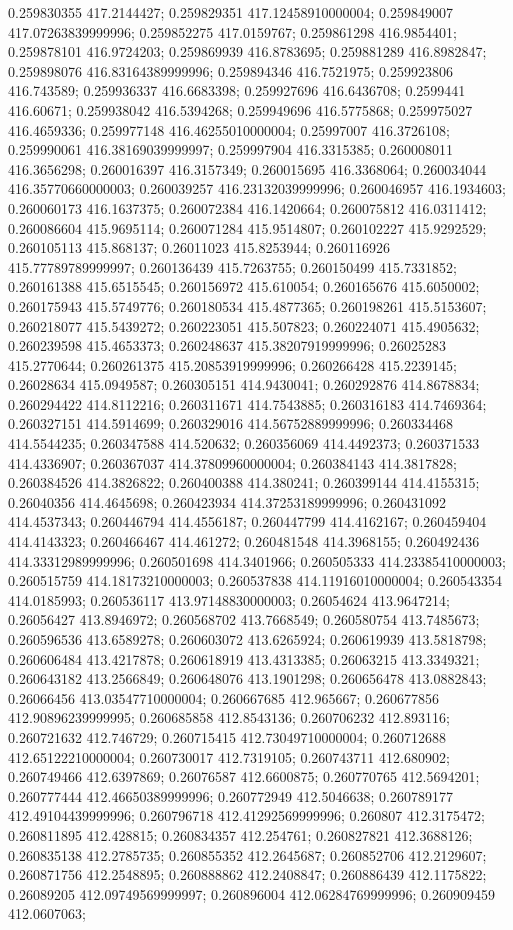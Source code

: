 0.259830355 417.2144427; 0.259829351 417.12458910000004; 0.259849007 417.07263839999996; 0.259852275 417.0159767; 0.259861298 416.9854401; 0.259878101 416.9724203; 0.259869939 416.8783695; 0.259881289 416.8982847; 0.259898076 416.83164389999996; 0.259894346 416.7521975; 0.259923806 416.743589; 0.259936337 416.6683398; 0.259927696 416.6436708; 0.2599441 416.60671; 0.259938042 416.5394268; 0.259949696 416.5775868; 0.259975027 416.4659336; 0.259977148 416.46255010000004; 0.25997007 416.3726108; 0.259990061 416.38169039999997; 0.259997904 416.3315385; 0.260008011 416.3656298; 0.260016397 416.3157349; 0.260015695 416.3368064; 0.260034044 416.35770660000003; 0.260039257 416.23132039999996; 0.260046957 416.1934603; 0.260060173 416.1637375; 0.260072384 416.1420664; 0.260075812 416.0311412; 0.260086604 415.9695114; 0.260071284 415.9514807; 0.260102227 415.9292529; 0.260105113 415.868137; 0.26011023 415.8253944; 0.260116926 415.77789789999997; 0.260136439 415.7263755; 0.260150499 415.7331852; 0.260161388 415.6515545; 0.260156972 415.610054; 0.260165676 415.6050002; 0.260175943 415.5749776; 0.260180534 415.4877365; 0.260198261 415.5153607; 0.260218077 415.5439272; 0.260223051 415.507823; 0.260224071 415.4905632; 0.260239598 415.4653373; 0.260248637 415.38207919999996; 0.26025283 415.2770644; 0.260261375 415.20853919999996; 0.260266428 415.2239145; 0.26028634 415.0949587; 0.260305151 414.9430041; 0.260292876 414.8678834; 0.260294422 414.8112216; 0.260311671 414.7543885; 0.260316183 414.7469364; 0.260327151 414.5914699; 0.260329016 414.56752889999996; 0.260334468 414.5544235; 0.260347588 414.520632; 0.260356069 414.4492373; 0.260371533 414.4336907; 0.260367037 414.37809960000004; 0.260384143 414.3817828; 0.260384526 414.3826822; 0.260400388 414.380241; 0.260399144 414.4155315; 0.26040356 414.4645698; 0.260423934 414.37253189999996; 0.260431092 414.4537343; 0.260446794 414.4556187; 0.260447799 414.4162167; 0.260459404 414.4143323; 0.260466467 414.461272; 0.260481548 414.3968155; 0.260492436 414.33312989999996; 0.260501698 414.3401966; 0.260505333 414.23385410000003; 0.260515759 414.18173210000003; 0.260537838 414.11916010000004; 0.260543354 414.0185993; 0.260536117 413.97148830000003; 0.26054624 413.9647214; 0.26056427 413.8946972; 0.260568702 413.7668549; 0.260580754 413.7485673; 0.260596536 413.6589278; 0.260603072 413.6265924; 0.260619939 413.5818798; 0.260606484 413.4217878; 0.260618919 413.4313385; 0.26063215 413.3349321; 0.260643182 413.2566849; 0.260648076 413.1901298; 0.260656478 413.0882843; 0.26066456 413.03547710000004; 0.260667685 412.965667; 0.260677856 412.90896239999995; 0.260685858 412.8543136; 0.260706232 412.893116; 0.260721632 412.746729; 0.260715415 412.73049710000004; 0.260712688 412.65122210000004; 0.260730017 412.7319105; 0.260743711 412.680902; 0.260749466 412.6397869; 0.26076587 412.6600875; 0.260770765 412.5694201; 0.260777444 412.46650389999996; 0.260772949 412.5046638; 0.260789177 412.49104439999996; 0.260796718 412.41292569999996; 0.260807 412.3175472; 0.260811895 412.428815; 0.260834357 412.254761; 0.260827821 412.3688126; 0.260835138 412.2785735; 0.260855352 412.2645687; 0.260852706 412.2129607; 0.260871756 412.2548895; 0.260888862 412.2408847; 0.260886439 412.1175822; 0.26089205 412.09749569999997; 0.260896004 412.06284769999996; 0.260909459 412.0607063; 